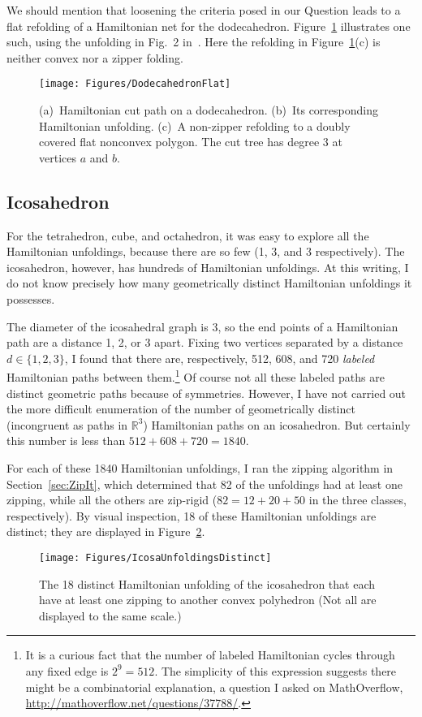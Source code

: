 \pdfoutput=1  \documentclass[]{article}
\newcommand{\figlab}[1]{\label{fig:#1}}
\newcommand{\secref}[1]{\ref{sec:#1}}
\newcommand{\figref}[1]{\ref{fig:#1}}
\def\R{{\mathbb{R}}}
\begin{document}
We should mention that loosening the criteria posed in our Question
leads to a flat refolding of a Hamiltonian net for the dodecahedron.
Figure~\figref{DodecahedronFlat} illustrates one such,
using the unfolding
in Fig.~2 in~\cite{lddss-zupc-10}.
Here the refolding in Figure~\figref{DodecahedronFlat}(c) is 
neither convex nor a zipper folding.
\begin{figure}[htbp]
\centering
\texttt{[image: Figures/DodecahedronFlat]}
\caption{(a)~Hamiltonian cut path on a dodecahedron.
(b)~Its corresponding Hamiltonian unfolding.
(c)~A non-zipper refolding to a doubly covered flat nonconvex polygon.
The cut tree has degree 3 at vertices $a$ and $b$.}
\figlab{DodecahedronFlat}
\end{figure}



\subsection{Icosahedron}
For the tetrahedron, cube, and octahedron, it was easy to explore
all the Hamiltonian unfoldings, because there are so few (1, 3, and 3
respectively).
The icosahedron, however, has hundreds of Hamiltonian unfoldings.
At this writing, I do not know precisely how many geometrically
distinct Hamiltonian unfoldings it possesses.

The diameter of the icosahedral graph is 3, so the end points of a
Hamiltonian path are a distance 1, 2, or 3 apart.
Fixing two vertices separated by a distance $d \in \{1,2,3\}$,
I found that there are, respectively,
512, 608, and 720 \emph{labeled} Hamiltonian paths between them.\footnote{
  It is a curious fact that the number of labeled Hamiltonian cycles
  through any fixed edge is $2^9 = 512$.
  The simplicity of this expression suggests there might be 
  a combinatorial explanation,
  a question I asked on MathOverflow,
  \url{http://mathoverflow.net/questions/37788/}.
}
Of course not all these labeled paths are distinct geometric paths
because of symmetries.
However, I have not carried out the more difficult enumeration of the 
number of geometrically distinct (incongruent as paths in $\R^3$)
Hamiltonian paths on an icosahedron.
But certainly this number is less than $512+608+720 = 1840$.

For each of these 1840 Hamiltonian unfoldings, I ran the zipping
algorithm
in Section~\secref{ZipIt}, which determined that 82 of the unfoldings
had at least one zipping, while all the others are zip-rigid
($82 = 12 + 20 + 50$ in the three classes, respectively).
By visual inspection, 18 of these Hamiltonian
unfoldings
are distinct; they are displayed in 
Figure~\figref{IcosaUnfoldingsDistinct}.
\begin{figure}[htbp]
\centering
\texttt{[image: Figures/IcosaUnfoldingsDistinct]}
\caption{The 18 distinct Hamiltonian unfolding of the icosahedron that
each have at least one zipping to another convex polyhedron
(Not all are displayed to the same scale.)}
\figlab{IcosaUnfoldingsDistinct}
\end{figure}
\end{document}
